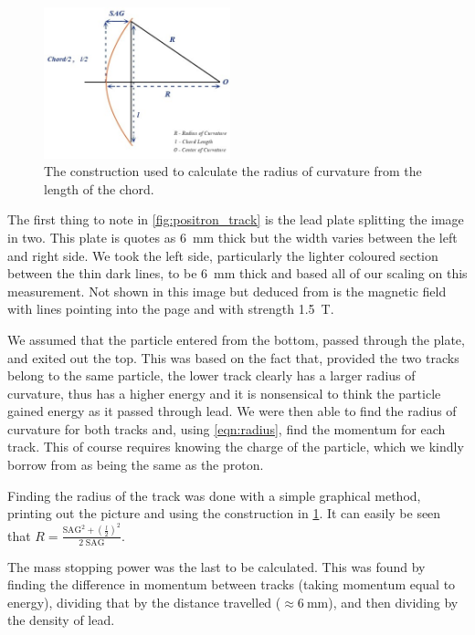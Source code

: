 \documentclass[11pt]{article}
\numberwithin{equation}{section}
\numberwithin{figure}{section}
\numberwithin{table}{section}
\begin{document}
\begin{figure}
    \vspace{-10pt}
    \includegraphics[width=0.48\textwidth]{Plots/radius.png}
    \caption{The construction used to calculate the radius of curvature from the length of the chord.}
    \label{fig:radius}
\end{figure}

The first thing to note in \cref{fig:positron_track} is the lead plate splitting the image in two. This plate is quotes as \SI{6}{\milli\metre} thick but the width varies between the left and right side. We took the left side, particularly the lighter coloured section between the thin dark lines, to be \SI{6}{\milli\metre} thick and based all of our scaling on this measurement. Not shown in this image but deduced from \cite{Pos_Electron} is the magnetic field with lines pointing into the page and with strength \SI{1.5}{\tesla}. 


We assumed that the particle entered from the bottom, passed through the plate, and exited out the top. This was based on the fact that, provided the two tracks belong to the same particle, the lower track clearly has a larger radius of curvature, thus has a higher energy and it is nonsensical to think the particle gained energy as it passed through lead. We were then able to find the radius of curvature for both tracks and, using \cref{eqn:radius}, find the momentum for each track. This of course requires knowing the charge of the particle, which we kindly borrow from \cite{Pos_Electron} as being the same as the proton. 


Finding the radius of the track was done with a simple graphical method, printing out the picture and using the construction in \cref{fig:radius}. It can easily be seen that $R=\frac{\mathrm{SAG}^2+\left(\frac{l}{2}\right)^2}{2\;\mathrm{SAG}}$. 

The mass stopping power was the last to be calculated. This was found by finding the difference in momentum between tracks (taking momentum equal to energy), dividing that by the distance travelled ($\approx \SI{6}{\milli\metre}$), and then dividing by the density of lead. 
\end{document}
